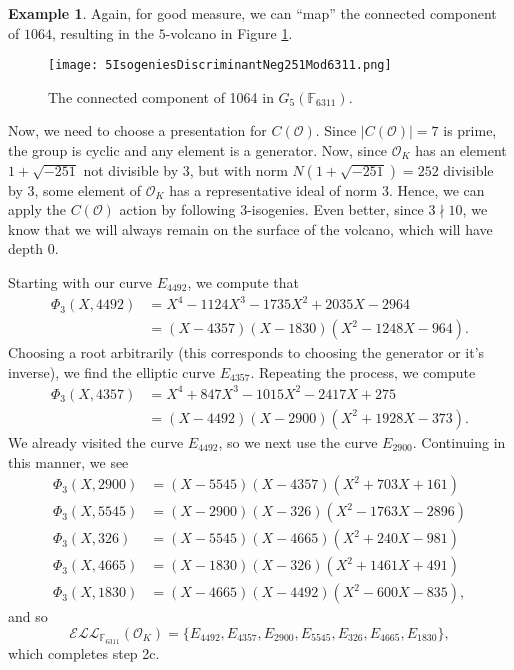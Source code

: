 \documentclass{amsart}
\theoremstyle{definition}
\newtheorem{example}[thm]{Example}
\theoremstyle{remark}
\numberwithin{equation}{section}
\newcommand{\cE}{\mathcal E}
\newcommand{\cL}{\mathcal L}
\newcommand{\cO}{\mathcal O}
\newcommand{\bbF}{\mathbb F}
\newcommand{\ELL}{\cE\cL\cL}
\begin{document}
\begin{example}
Again, for good measure, we can ``map'' the connected component of $1064$, resulting in the $5$-volcano in Figure \ref{fig:5VolcanoForExample}.

\begin{figure} \label{fig:5VolcanoForExample}
 \centering
 \texttt{[image: 5IsogeniesDiscriminantNeg251Mod6311.png]}  %
  \caption{The connected component of 1064 in $G_{5}(\bbF_{6311})$.}
 \end{figure}
 
 Now, we need to choose a presentation for $C(\cO)$. Since $|C(\cO)| = 7$ is prime, the group is cyclic and any element is a generator. Now, since $\cO_{K}$ has an element $1 + \sqrt{-251}$ not divisible by $3$, but with norm $N(1 + \sqrt{-251}) = 252$ divisible by $3$, some element of $\cO_{K}$ has a representative ideal of norm $3$. Hence, we can apply the $C(\cO)$ action by following $3$-isogenies. Even better, since $3\nmid 10$, we know that we will always remain on the surface of the volcano, which will have depth $0$.

Starting with our curve $E_{4492}$, we compute that
\begin{align*}                              
\Phi_{3}(X, 4492) & = X^4 - 1124 X^3 - 1735 X^2 + 2035 X - 2964 \\
                  & = (X - 4357)   (X - 1830)   (X^2 - 1248 X - 964).
\end{align*}
Choosing a root arbitrarily (this corresponds to choosing the generator or it's inverse), we find the elliptic curve $E_{4357}$. Repeating the process, we compute
\begin{align*}  
\Phi_{3}(X, 4357) & = X^4 + 847 X^3 - 1015 X^2 - 2417 X + 275 \\
                  & = (X - 4492)   (X - 2900)   (X^2 + 1928 X - 373). 
\end{align*}
We already visited the curve $E_{4492}$, so we next use the curve $E_{2900}$. Continuing in this manner, we see
\begin{align*} 
\Phi_{3}(X, 2900) & = (X - 5545)   (X - 4357)   (X^2 + 703 X + 161) \\
\Phi_{3}(X, 5545) & = (X - 2900)   (X - 326)   (X^2 - 1763 X - 2896) \\
\Phi_{3}(X, 326)  & = (X - 5545)   (X - 4665)   (X^2 + 240 X - 981) \\  
\Phi_{3}(X, 4665) & = (X - 1830)   (X - 326)   (X^2 + 1461 X + 491) \\  
\Phi_{3}(X, 1830) & = (X - 4665)   (X - 4492)   (X^2 - 600 X - 835),
\end{align*}
and so
\[
\ELL_{\bbF_{6311}}(\cO_{K}) = \{E_{4492}, E_{4357}, E_{2900}, E_{5545}, E_{326}, E_{4665}, E_{1830}\},
\]
which completes step 2c.


\end{example}
\end{document}
